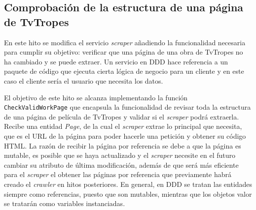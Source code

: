 \subsection{Comprobación de la estructura de una página de TvTropes}
En este hito se modifica el servicio \textit{scraper} añadiendo la funcionalidad
necesaria para cumplir su objetivo: verificar que una página de una obra de
TvTropes no ha cambiado y se puede extraer. Un servicio en DDD hace referencia a
un paquete de código que ejecuta cierta lógica de negocio para un cliente y en
este caso el cliente sería el usuario que necesita los datos. 

El objetivo de este hito se alcanza implementando la función \texttt{CheckValidWorkPage} que encapsula la funcionalidad de revisar toda la
estructura de una página de película de TvTropes y validar si el
\textit{scraper} podrá extraerla. Recibe una entidad \textit{Page}, de la cual
el \textit{scraper} extrae lo principal que necesita, que es el URL de la página
para poder hacerle una petición y obtener su código HTML. La razón de recibir la
página por referencia se debe a que la página es mutable, es posible que se haya
actualizado y el \textit{scraper} necesite en el futuro cambiar su atributo de
última modificación, además de que será más eficiente para el \textit{scraper}
el obtener las páginas por referencia que previamente habrá creado el
\textit{crawler} en hitos posteriores. En general, en DDD se tratan las
entidades siempre como referencias, puesto que son mutables, mientras que los
objetos valor se tratarán como variables instanciadas. 

